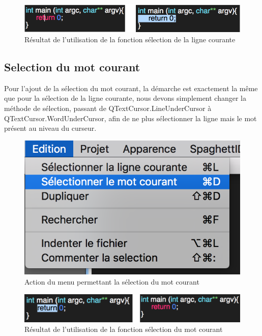 \documentclass[a4paper,12pt]{article}
\begin{document}
	\begin{figure}[h!]
		\begin{center}
			\includegraphics[scale=0.8]{images/imgs_edit/resultat_selection_ligne}
			\caption{Résultat de l'utilisation de la fonction sélection de la ligne courante}
		\end{center}
	\end{figure}

\subsection{Selection du mot courant}

	Pour l'ajout de la sélection du mot courant, la démarche est exactement la même que pour la sélection de la ligne courante, nous devons simplement changer la méthode de sélection, passant de QTextCursor.LineUnderCursor à QTextCursor.WordUnderCursor, afin de ne plus sélectionner la ligne mais le mot présent au niveau du curseur. 

	\begin{figure}[h!]
		\begin{center}
			\includegraphics[scale=0.4]{images/imgs_edit/utilisation_selection_mot}
			\caption{Action du menu permettant la sélection du mot courant}
		\end{center}
	\end{figure}

	\begin{figure}[h!]
		\begin{center}
			\includegraphics[scale=0.8]{images/imgs_edit/resultat_selection_mot}
			\caption{Résultat de l'utilisation de la fonction sélection du mot courant}
		\end{center}
	\end{figure}
	
\end{document}
